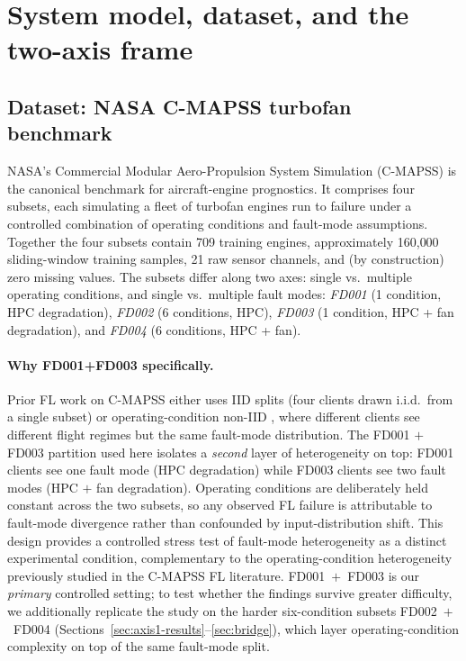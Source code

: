 \documentclass[a4paper,fleqn,doubleblind]{cas-sc}
\begin{document}

\section{System model, dataset, and the two-axis frame}
\label{sec:system}

\subsection{Dataset: NASA C-MAPSS turbofan benchmark}
\label{subsec:dataset}

NASA's Commercial Modular Aero-Propulsion System Simulation
(C-MAPSS) \citep{Saxena2008CMAPSS} is the canonical benchmark for
aircraft-engine prognostics. It comprises four subsets, each
simulating a fleet of turbofan engines run to failure under a
controlled combination of operating conditions and fault-mode
assumptions. Together the four subsets contain 709 training engines,
approximately 160{,}000 sliding-window training samples, 21 raw
sensor channels, and (by construction) zero missing values.
The subsets differ along two axes: single vs.\ multiple operating
conditions, and single vs.\ multiple fault modes:
\emph{FD001} (1 condition, HPC degradation), \emph{FD002}
(6 conditions, HPC), \emph{FD003} (1 condition, HPC + fan
degradation), and \emph{FD004} (6 conditions, HPC + fan).

\paragraph{Why FD001+FD003 specifically.}
Prior FL work on C-MAPSS either uses IID splits (four clients drawn
i.i.d.\ from a single subset) or operating-condition non-IID
\citep{Pandhare2021FederatedBaseline}, where different clients see
different flight regimes but the same fault-mode distribution. The
FD001 $+$ FD003 partition used here isolates a \emph{second} layer
of heterogeneity on top: FD001 clients see one fault mode
(HPC degradation) while FD003 clients see two fault modes (HPC $+$
fan degradation). Operating conditions are deliberately held
constant across the two subsets, so any observed FL failure is
attributable to fault-mode divergence rather than confounded by
input-distribution shift. This design provides a controlled stress
test of fault-mode heterogeneity as a distinct experimental
condition, complementary to the operating-condition heterogeneity
previously studied in the C-MAPSS FL literature. FD001~$+$~FD003 is
our \emph{primary} controlled setting; to test whether the findings
survive greater difficulty, we additionally replicate the study on
the harder six-condition subsets FD002~$+$~FD004
(Sections~\ref{sec:axis1-results}--\ref{sec:bridge}), which layer
operating-condition complexity on top of the same fault-mode split.
\end{document}

